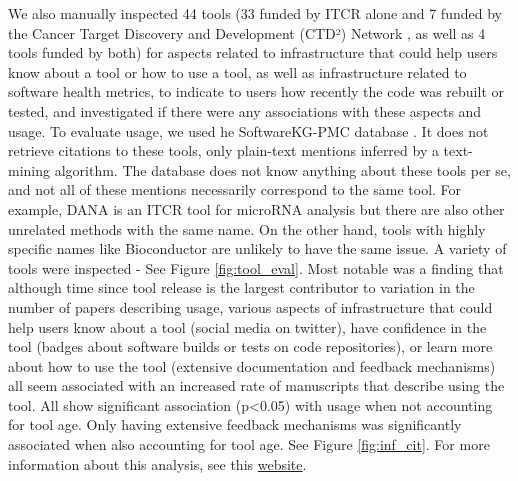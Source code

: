 \documentclass{article}
\begin{document}
We also manually inspected 44 tools (33 funded by ITCR alone and 7 funded by the Cancer Target Discovery and Development (CTD²) Network \cite{aksoy_ctd2_2017}, as well as 4 tools funded by both) for aspects related to infrastructure that could help users know about a tool or how to use a tool, as well as infrastructure related to software health metrics, to indicate to users how recently the code was rebuilt or tested,  and investigated if there were any associations with these aspects and usage. To evaluate usage, we used he SoftwareKG-PMC database \cite{Kruger_usage_20}. It does not retrieve citations to these tools, only plain-text mentions inferred by a text-mining algorithm. The database does not know anything about these tools per se, and not all of these mentions necessarily correspond to the same tool. For example, DANA is an ITCR tool for microRNA analysis but there are also other unrelated methods with the same name. On the other hand, tools with highly specific names like Bioconductor are unlikely to have the same issue. A variety of tools were inspected - See Figure \ref{fig:tool_eval}. Most notable was a finding that although time since tool release is the largest contributor to variation in the number of papers describing usage, various aspects of infrastructure that could help users know about a tool (social media on twitter), have confidence in the tool (badges about software builds or tests on code repositories), or learn more about how to use the tool (extensive documentation and feedback mechanisms) all seem associated with an increased rate of manuscripts that describe using the tool. All show significant association (p<0.05) with usage when not accounting for tool age. Only having extensive feedback mechanisms was significantly associated when also accounting for tool age. See Figure \ref{fig:inf_cit}. For more information about this analysis, see this \href{https://hutchdatascience.org/ITCR_Metrics_manuscript_website/}{website}.
\end{document}
